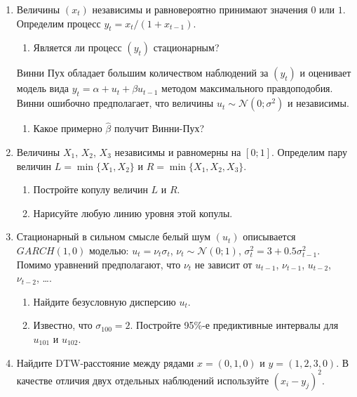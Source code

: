 \documentclass[12pt]{article}
\newcommand \cN{\mathcal{N}}
\begin{document}

\begin{enumerate}

\item Величины $(x_t)$ независимы и равновероятно принимают значения $0$ или $1$. 
Определим процесс $y_t = x_t / (1 + x_{t-1})$.

\begin{enumerate}
    \item Является ли процесс $(y_t)$ стационарным?
\end{enumerate}

Винни Пух обладает большим количеством наблюдений за $(y_t)$ и оценивает модель вида $y_t = \alpha + u_t + \beta u_{t-1}$
    методом максимального правдоподобия. 
Винни ошибочно предполагает, что величины $u_t \sim \cN(0;\sigma^2)$ и независимы.
    
\begin{enumerate}[resume]
   \item Какое примерно $\hat\beta$ получит Винни-Пух?
\end{enumerate}


\item Величины $X_1$, $X_2$, $X_3$ независимы и равномерны на $[0;1]$.
Определим пару величин $L = \min\{X_1, X_2\}$ и $R = \min\{X_1, X_2, X_3\}$.

\begin{enumerate}
    \item Постройте копулу величин $L$ и $R$. 
    \item Нарисуйте любую линию уровня этой копулы. 
\end{enumerate}


\item Стационарный в сильном смысле белый шум $(u_t)$ описывается $GARCH(1, 0)$ моделью:
$u_t = \nu_t \sigma_t$, $\nu_t \sim \cN(0;1)$, $\sigma_t^2 = 3 + 0.5 \sigma_{t-1}^2$.
Помимо уравнений предполагают, что $\nu_t$ не зависит от $u_{t-1}$, $\nu_{t-1}$, $u_{t-2}$, $\nu_{t-2}$, \ldots. 

\begin{enumerate}
    \item Найдите безусловную дисперсию $u_t$.
    \item Известно, что $\sigma_{100} = 2$. 
    Постройте 95\%-е предиктивные интервалы для $u_{101}$ и $u_{102}$.
\end{enumerate}



\item Найдите DTW-расстояние между рядами $x = (0, 1, 0)$ и $y = (1, 2, 3, 0)$. 
В качестве отличия двух отдельных наблюдений используйте $(x_i - y_j)^2$.



\end{enumerate}
\end{document}
